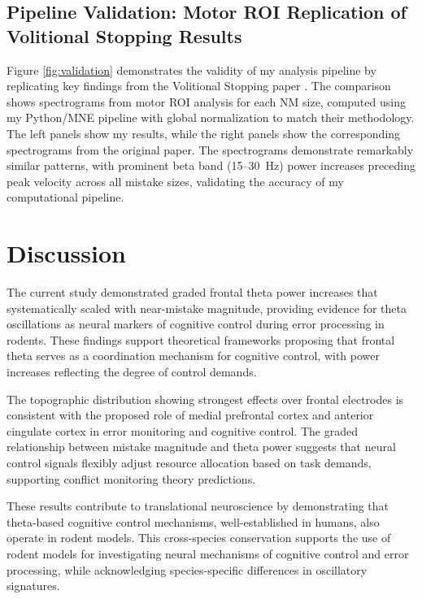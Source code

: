 \documentclass[11pt]{article}
\begin{document}
\subsection{Pipeline Validation: Motor ROI Replication of Volitional Stopping Results}

Figure \ref{fig:validation} demonstrates the validity of my analysis pipeline by replicating key findings from the Volitional Stopping paper \citep{doutel2024volitional}. The comparison shows spectrograms from motor ROI analysis for each NM size, computed using my Python/MNE pipeline with global normalization to match their methodology. The left panels show my results, while the right panels show the corresponding spectrograms from the original paper. The spectrograms demonstrate remarkably similar patterns, with prominent beta band (15--30~Hz) power increases preceding peak velocity across all mistake sizes, validating the accuracy of my computational pipeline.

\section{Discussion}

The current study demonstrated graded frontal theta power increases that systematically scaled with near-mistake magnitude, providing evidence for theta oscillations as neural markers of cognitive control during error processing in rodents. These findings support theoretical frameworks proposing that frontal theta serves as a coordination mechanism for cognitive control, with power increases reflecting the degree of control demands.

The topographic distribution showing strongest effects over frontal electrodes is consistent with the proposed role of medial prefrontal cortex and anterior cingulate cortex in error monitoring and cognitive control. The graded relationship between mistake magnitude and theta power suggests that neural control signals flexibly adjust resource allocation based on task demands, supporting conflict monitoring theory predictions.

These results contribute to translational neuroscience by demonstrating that theta-based cognitive control mechanisms, well-established in humans, also operate in rodent models. This cross-species conservation supports the use of rodent models for investigating neural mechanisms of cognitive control and error processing, while acknowledging species-specific differences in oscillatory signatures.
\end{document}
